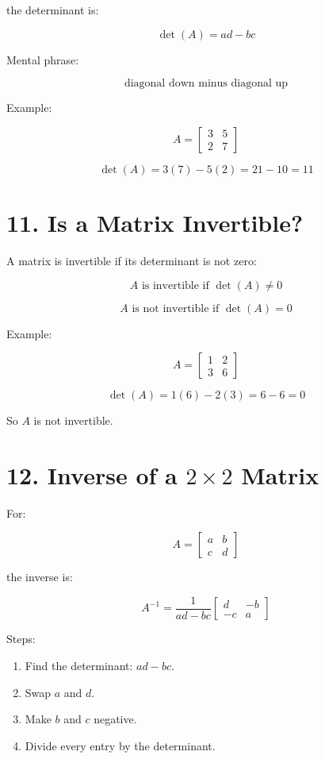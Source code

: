 \documentclass[11pt]{article}
\begin{document}
the determinant is:

\[
\det(A)=ad-bc
\]

Mental phrase:

\[
\text{diagonal down minus diagonal up}
\]

Example:

\[
A=
\begin{bmatrix}
3 & 5\\
2 & 7
\end{bmatrix}
\]

\[
\det(A)=3(7)-5(2)=21-10=11
\]

\section*{11. Is a Matrix Invertible?}

A matrix is invertible if its determinant is not zero:

\[
A \text{ is invertible if } \det(A)\ne 0
\]

\[
A \text{ is not invertible if } \det(A)=0
\]

Example:

\[
A=
\begin{bmatrix}
1 & 2\\
3 & 6
\end{bmatrix}
\]

\[
\det(A)=1(6)-2(3)=6-6=0
\]

So \(A\) is not invertible.

\section*{12. Inverse of a \(2\times2\) Matrix}

For:

\[
A=
\begin{bmatrix}
a & b\\
c & d
\end{bmatrix}
\]

the inverse is:

\[
A^{-1}
=
\frac{1}{ad-bc}
\begin{bmatrix}
d & -b\\
-c & a
\end{bmatrix}
\]

Steps:

\begin{enumerate}
  \item Find the determinant: \(ad-bc\).
  \item Swap \(a\) and \(d\).
  \item Make \(b\) and \(c\) negative.
  \item Divide every entry by the determinant.
\end{enumerate}
\end{document}
